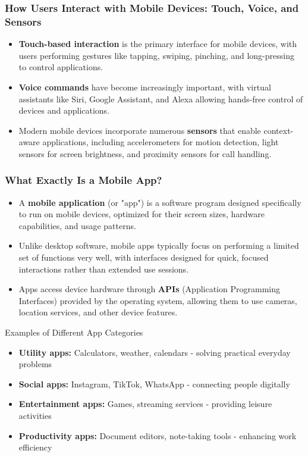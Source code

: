 \documentclass{beamer}
\begin{document}
	\begin{frame}
		\frametitle{How Users Interact with Mobile Devices: Touch, Voice, and Sensors}
		
		\begin{itemize}
			\item \textbf{Touch-based interaction} is the primary interface for mobile devices, with users performing gestures like tapping, swiping, pinching, and long-pressing to control applications.
			\item \textbf{Voice commands} have become increasingly important, with virtual assistants like Siri, Google Assistant, and Alexa allowing hands-free control of devices and applications.
			\item Modern mobile devices incorporate numerous \textbf{sensors} that enable context-aware applications, including accelerometers for motion detection, light sensors for screen brightness, and proximity sensors for call handling.
		\end{itemize}
		
		
	\end{frame}
	
	\begin{frame}
		\frametitle{What Exactly Is a Mobile App?}
		
		\begin{itemize}
			\item A \textbf{mobile application} (or "app") is a software program designed specifically to run on mobile devices, optimized for their screen sizes, hardware capabilities, and usage patterns.
			\item Unlike desktop software, mobile apps typically focus on performing a limited set of functions very well, with interfaces designed for quick, focused interactions rather than extended use sessions.
			\item Apps access device hardware through \textbf{APIs} (Application Programming Interfaces) provided by the operating system, allowing them to use cameras, location services, and other device features.
		\end{itemize}
		
		\begin{exampleblock}{\scriptsize{Examples of Different App Categories}}
			\scriptsize{
				\begin{itemize}
					\item \textbf{Utility apps:} Calculators, weather, calendars - solving practical everyday problems
					\item \textbf{Social apps:} Instagram, TikTok, WhatsApp - connecting people digitally
					\item \textbf{Entertainment apps:} Games, streaming services - providing leisure activities
					\item \textbf{Productivity apps:} Document editors, note-taking tools - enhancing work efficiency
				\end{itemize}
			}
		\end{exampleblock}
		
	\end{frame}
	
\end{document}
